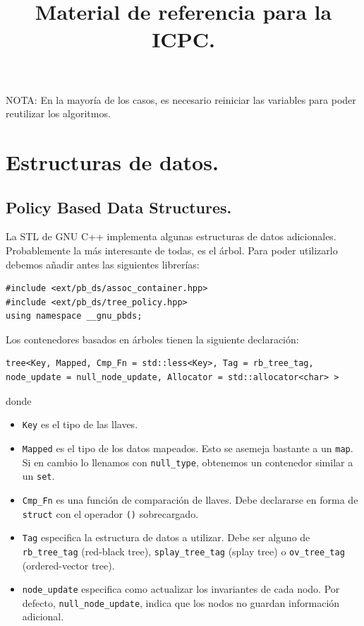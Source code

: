 \documentclass[10pt, letterpaper, twoside]{article}
\title{Material de referencia para la ICPC.}
\author{}
\date{}
\begin{document}
\maketitle

\tableofcontents

\bigskip

\noindent NOTA: En la mayoría de los casos, es necesario reiniciar las variables para poder reutilizar los algoritmos.

\newpage

\section{Estructuras de datos.}

\subsection{Policy Based Data Structures.}

La STL de GNU C++ implementa algunas estructuras de datos adicionales. Probablemente la más interesante de todas, es el árbol. Para poder utilizarlo debemos añadir antes las siguientes librerías:

\begin{lstlisting}
#include <ext/pb_ds/assoc_container.hpp>
#include <ext/pb_ds/tree_policy.hpp>
using namespace __gnu_pbds;
\end{lstlisting}

Los contenedores basados en árboles tienen la siguiente declaración:

\begin{lstlisting}
tree<Key, Mapped, Cmp_Fn = std::less<Key>, Tag = rb_tree_tag, node_update = null_node_update, Allocator = std::allocator<char> >
\end{lstlisting}

donde
\begin{itemize}
\item \texttt{Key} es el tipo de las llaves.

\item \texttt{Mapped} es el tipo de los datos mapeados. Esto se asemeja bastante a un \texttt{map}. Si en cambio lo llenamos con \texttt{null\_type}, obtenemos un contenedor similar a un \texttt{set}.

\item \texttt{Cmp\_Fn} es una función de comparación de llaves. Debe declararse en forma de \texttt{struct} con el operador \texttt{()} sobrecargado.

\item \texttt{Tag} especifica la estructura de datos a utilizar. Debe ser alguno de \texttt{rb\_tree\_tag} (red-black tree), \texttt{splay\_tree\_tag} (splay tree) o \texttt{ov\_tree\_tag} (ordered-vector tree).

\item \texttt{node\_update} especifica como actualizar los invariantes de cada nodo. Por defecto, \texttt{null\_node\_update}, indica que los nodos no guardan información adicional.
\end{itemize}
\end{document}
